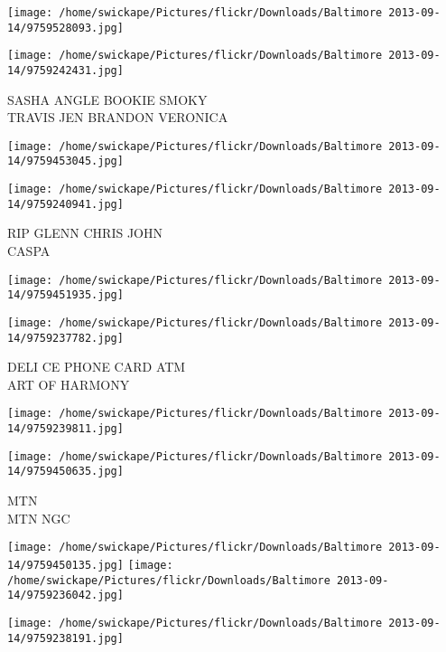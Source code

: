 \documentclass[10pt,letterpaper]{article}
\begin{document}
\texttt{[image: /home/swickape/Pictures/flickr/Downloads/Baltimore 2013-09-14/9759528093.jpg]}

\vspace{0.25in}
\texttt{[image: /home/swickape/Pictures/flickr/Downloads/Baltimore 2013-09-14/9759242431.jpg]}

SASHA ANGLE BOOKIE SMOKY\\
TRAVIS JEN BRANDON VERONICA\\
\pagebreak

\texttt{[image: /home/swickape/Pictures/flickr/Downloads/Baltimore 2013-09-14/9759453045.jpg]}

\vspace{0.25in}
\texttt{[image: /home/swickape/Pictures/flickr/Downloads/Baltimore 2013-09-14/9759240941.jpg]}

RIP GLENN CHRIS JOHN\\
CASPA\\
\pagebreak

\texttt{[image: /home/swickape/Pictures/flickr/Downloads/Baltimore 2013-09-14/9759451935.jpg]}

\vspace{0.25in}
\texttt{[image: /home/swickape/Pictures/flickr/Downloads/Baltimore 2013-09-14/9759237782.jpg]}

DELI CE PHONE CARD ATM\\
ART OF HARMONY\\
\pagebreak

\texttt{[image: /home/swickape/Pictures/flickr/Downloads/Baltimore 2013-09-14/9759239811.jpg]}

\vspace{0.25in}
\texttt{[image: /home/swickape/Pictures/flickr/Downloads/Baltimore 2013-09-14/9759450635.jpg]}

MTN\\
MTN NGC\\
\pagebreak

\texttt{[image: /home/swickape/Pictures/flickr/Downloads/Baltimore 2013-09-14/9759450135.jpg]}
\texttt{[image: /home/swickape/Pictures/flickr/Downloads/Baltimore 2013-09-14/9759236042.jpg]}

\vspace{0.25in}
\texttt{[image: /home/swickape/Pictures/flickr/Downloads/Baltimore 2013-09-14/9759238191.jpg]}
\end{document}
